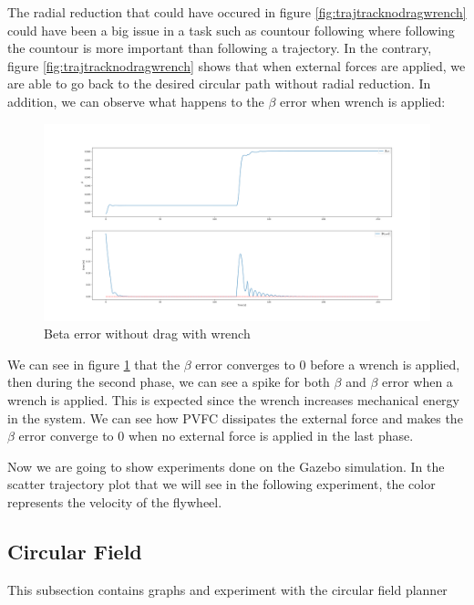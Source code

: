 The radial reduction that could have occured in figure \ref{fig:trajtracknodragwrench} could have been a big issue in a task such as countour following where following the countour is more important than following a trajectory.
In the contrary, figure \ref{fig:trajtracknodragwrench} shows that when external forces are applied, we are able to go back to the desired circular path without radial reduction.
In addition, we can observe what happens to the $\beta$ error when wrench is applied:
\begin{figure}[h!]
   \centering
   \includegraphics[width=\linewidth, scale=1.5]{Images/betaerrornodragwrench.png}
   \caption{Beta error without drag with wrench}
   \label{fig:betaerrornodragwrench}
\end{figure}
We can see in figure \ref{fig:betaerrornodragwrench} that the $\beta$ error converges to 0 before a wrench is applied, 
then during the second phase, we can see a spike for both $\beta$ and $\beta$ error when a wrench is applied. This is expected since the wrench increases mechanical energy in the system. 
We can see how PVFC dissipates the external force and makes the $\beta$ error converge to 0 when no external force is applied in the last phase.

Now we are going to show experiments done on the Gazebo simulation.
In the scatter trajectory plot that we will see in the following experiment, the color represents the velocity of the flywheel.
\subsection{Circular Field}
This subsection contains graphs and experiment with the circular field planner
